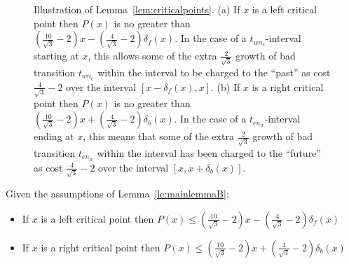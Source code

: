 \begin{figure}
\induction

\caption{Illustration of Lemma~\ref{lem:criticalpoints}. (a) If $x$ is a left
critical point then $P(x)$ is no greater than
$(\frac{10}{\sqrt{3}}-2)x - (\frac{4}{\sqrt{3}} - 2)\delta_f(x)$.
In the case of a $t_{wn_e}$-interval starting at $x$, this allows some of the
extra $\frac{2}{\sqrt{3}}$ growth of bad transition $t_{wn_e}$ within the interval
to be charged to the ``past'' as cost $\frac{4}{\sqrt{3}}-2$ over the interval
$[x-\delta_f(x),x]$. 
(b) If $x$ is a right critical point then $P(x)$ is no greater than
$(\frac{10}{\sqrt{3}}-2)x + (\frac{4}{\sqrt{3}} - 2)\delta_b(x)$.
In the case of a $t_{en_w}$-interval ending at $x$, this means that some
of the extra $\frac{2}{\sqrt{3}}$ growth of bad transition $t_{en_w}$ within the
interval has been charged to the ``future'' as cost $\frac{4}{\sqrt{3}}-2$
over the interval $[x, x+\delta_b(x)]$.}
\label{fig:induction}
\end{figure}


\begin{lemma}
\label{lem:criticalpoints}
Given the assumptions of Lemma~\ref{le:mainlemmaB}:
\begin{itemize}
\item If $x$ is a left critical point then $P(x) \leq \left(\frac{10}{\sqrt{3}}-2\right)x - \left(\frac{4}{\sqrt{3}}-2\right)\delta_f(x)$
\item If $x$ is a right critical point then $P(x) \leq \left(\frac{10}{\sqrt{3}}-2\right)x + \left(\frac{4}{\sqrt{3}}-2\right)\delta_b(x)$
\end{itemize}
\end{lemma}


